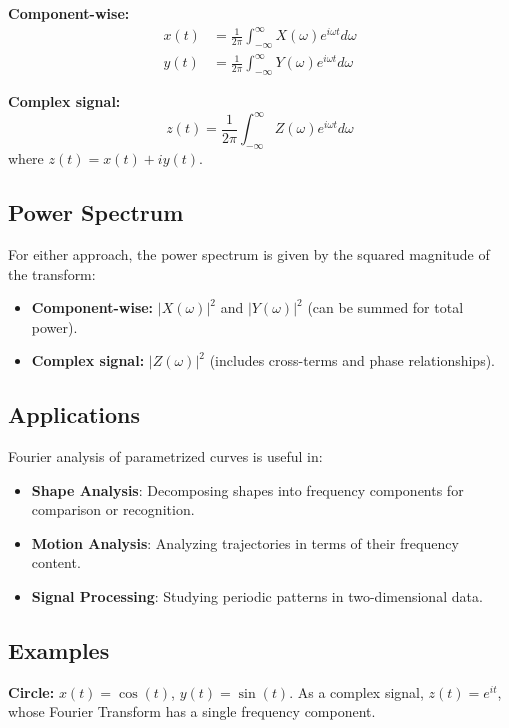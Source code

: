 \documentclass[11pt,a4paper]{article}
\begin{document}
\textbf{Component-wise:}
\begin{align}
x(t) &= \frac{1}{2\pi} \int_{-\infty}^{\infty} X(\omega) e^{i\omega t} d\omega \\
y(t) &= \frac{1}{2\pi} \int_{-\infty}^{\infty} Y(\omega) e^{i\omega t} d\omega
\end{align}

\textbf{Complex signal:}
\begin{equation}
z(t) = \frac{1}{2\pi} \int_{-\infty}^{\infty} Z(\omega) e^{i\omega t} d\omega
\end{equation}
where $z(t) = x(t) + i y(t)$.

\subsection{Power Spectrum}

For either approach, the power spectrum is given by the squared magnitude of the transform:
\begin{itemize}
    \item \textbf{Component-wise:} $|X(\omega)|^2$ and $|Y(\omega)|^2$ (can be summed for total power).
    \item \textbf{Complex signal:} $|Z(\omega)|^2$ (includes cross-terms and phase relationships).
\end{itemize}

\subsection{Applications}

Fourier analysis of parametrized curves is useful in:
\begin{itemize}
    \item \textbf{Shape Analysis}: Decomposing shapes into frequency components for comparison or recognition.
    \item \textbf{Motion Analysis}: Analyzing trajectories in terms of their frequency content.
    \item \textbf{Signal Processing}: Studying periodic patterns in two-dimensional data.
\end{itemize}

\subsection{Examples}

\textbf{Circle:} $x(t) = \cos(t)$, $y(t) = \sin(t)$. As a complex signal, $z(t) = e^{it}$, whose Fourier Transform has a single frequency component.
\end{document}
